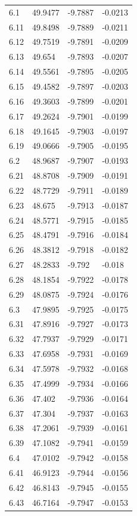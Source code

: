 \begin{tabular}{llll}
6.1 & 49.9477 & -9.7887 & -0.0213 \\
6.11 & 49.8498 & -9.7889 & -0.0211 \\
6.12 & 49.7519 & -9.7891 & -0.0209 \\
6.13 & 49.654 & -9.7893 & -0.0207 \\
6.14 & 49.5561 & -9.7895 & -0.0205 \\
6.15 & 49.4582 & -9.7897 & -0.0203 \\
6.16 & 49.3603 & -9.7899 & -0.0201 \\
6.17 & 49.2624 & -9.7901 & -0.0199 \\
6.18 & 49.1645 & -9.7903 & -0.0197 \\
6.19 & 49.0666 & -9.7905 & -0.0195 \\
6.2 & 48.9687 & -9.7907 & -0.0193 \\
6.21 & 48.8708 & -9.7909 & -0.0191 \\
6.22 & 48.7729 & -9.7911 & -0.0189 \\
6.23 & 48.675 & -9.7913 & -0.0187 \\
6.24 & 48.5771 & -9.7915 & -0.0185 \\
6.25 & 48.4791 & -9.7916 & -0.0184 \\
6.26 & 48.3812 & -9.7918 & -0.0182 \\
6.27 & 48.2833 & -9.792 & -0.018 \\
6.28 & 48.1854 & -9.7922 & -0.0178 \\
6.29 & 48.0875 & -9.7924 & -0.0176 \\
6.3 & 47.9895 & -9.7925 & -0.0175 \\
6.31 & 47.8916 & -9.7927 & -0.0173 \\
6.32 & 47.7937 & -9.7929 & -0.0171 \\
6.33 & 47.6958 & -9.7931 & -0.0169 \\
6.34 & 47.5978 & -9.7932 & -0.0168 \\
6.35 & 47.4999 & -9.7934 & -0.0166 \\
6.36 & 47.402 & -9.7936 & -0.0164 \\
6.37 & 47.304 & -9.7937 & -0.0163 \\
6.38 & 47.2061 & -9.7939 & -0.0161 \\
6.39 & 47.1082 & -9.7941 & -0.0159 \\
6.4 & 47.0102 & -9.7942 & -0.0158 \\
6.41 & 46.9123 & -9.7944 & -0.0156 \\
6.42 & 46.8143 & -9.7945 & -0.0155 \\
6.43 & 46.7164 & -9.7947 & -0.0153 \\

\end{tabular}
